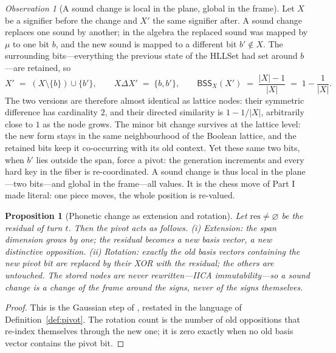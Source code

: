 \documentclass[11pt,a4paper]{article}
\newtheorem{proposition}[principle]{Proposition}
\theoremstyle{remark}
\newtheorem{observation}[principle]{Observation}
\newcommand{\xor}{\ensuremath{\Delta}}                   %
\newcommand{\BSS}{\ensuremath{\mathsf{BSS}}}             %
\newcommand{\res}{\ensuremath{\mathrm{res}}}             %
\newcommand{\Ing}{\ensuremath{\mu}}                      %
\begin{document}
\begin{observation}[A sound change is local in the plane, global in the frame]
\label{obs:local-global}
Let $X$ be a signifier before the change and $X'$ the same signifier after.
A sound change replaces one sound by another; in the algebra the replaced
sound was mapped by $\Ing$ to one bit $b$, and the new sound is mapped to a
different bit $b' \notin X$. The surrounding bits---everything the previous
state of the HLLSet had set around $b$---are retained, so
\[
  X' \;=\; (X \setminus \{b\}) \cup \{b'\},
  \qquad
  X \xor X' \;=\; \{b, b'\},
  \qquad
  \BSS_X(X') \;=\; \frac{|X|-1}{|X|} \;=\; 1 - \frac{1}{|X|}.
\]
The two versions are therefore almost identical as lattice nodes: their
symmetric difference has cardinality $2$, and their directed similarity is
$1 - 1/|X|$, arbitrarily close to $1$ as the node grows. The minor bit
change survives at the lattice level: the new form stays in the same
neighbourhood of the Boolean lattice, and the retained bits keep it
co-occurring with its old context. Yet these same two bits, when $b'$ lies
outside the span, force a pivot: the generation increments and every hard
key in the fiber is re-coordinated. A sound change is thus local in the
plane---two bits---and global in the frame---all values. It is the chess
move of Part I made literal: one piece moves, the whole position is
re-valued.
\end{observation}

\begin{proposition}[Phonetic change as extension and rotation]
\label{prop:sound}
Let $\res \neq \varnothing$ be the residual of turn $t$. Then the pivot acts
as follows. (i) \emph{Extension:} the span dimension grows by one; the
residual becomes a new basis vector, a new distinctive opposition.
(ii) \emph{Rotation:} exactly the old basis vectors containing the new pivot
bit are replaced by their XOR with the residual; the others are untouched.
The stored nodes are never rewritten---IICA immutability---so a sound change
is a change of the frame around the signs, never of the signs themselves.
\end{proposition}

\begin{proof}
This is the Gaussian step of \cite{state2026}, restated in the language of
Definition~\ref{def:pivot}. The rotation count is the number of old
oppositions that re-index themselves through the new one; it is zero exactly
when no old basis vector contains the pivot bit.
\end{proof}
\end{document}
